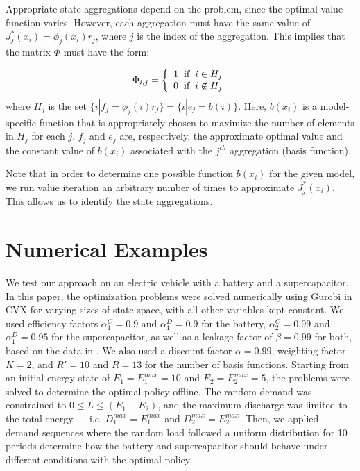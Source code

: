 \documentclass[conference]{IEEEtran}
\begin{document}
    Appropriate state aggregations depend on the problem, since the optimal value function varies. %
    However, each aggregation must have the same value of $J^{*}_{j}(x_{i}) = \phi_{j}(x_{i})r_{j}$, where $j$ is the index of the aggregation. This implies that the matrix $\Phi$ must have the form:
    
    \begin{displaymath}
        \Phi_{i,j}=\left\{
            \begin{array}{l}
            1 \hspace{0.2cm} \text{if} \hspace{0.2cm} i\in H_{j}\\
            0 \hspace{0.2cm} \text{if} \hspace{0.2cm} i\not\in H_{j}
            \end{array}
            \right.
    \end{displaymath}where $H_{j}$ is the set $\{i|f_{j} = \phi_{j}(i)r_{j}\}=\{i|e_{j} = b(i)\}$. Here, $b(x_{i})$ is a model-specific function that is appropriately chosen to maximize the number of elements in $H_{j}$ for each $j$. $f_{j}$ and $e_{j}$ are, respectively, the approximate optimal value and the constant value of $b(x_{i})$ associated with the $j^{th}$ aggregation (basis function).
	
	Note that in order to determine one possible function $b(x_{i})$ for the given model, we run value iteration an arbitrary number of times to approximate $J^{*}_{j}(x_{i})$. This allows us to identify the state aggregations.
    

\section{Numerical Examples}
We test our approach on an electric vehicle with a battery and a supercapacitor. In this paper, the optimization problems were solved numerically using Gurobi in CVX for varying sizes of state space, with all other variables kept constant. We used efficiency factors $\alpha^{C}_{1}=0.9$ and $\alpha^{D}_{1}=0.9$ for the battery, $\alpha^{C}_{2}=0.99$ and $\alpha^{D}_{1}=0.95$ for the supercapacitor, as well as a leakage factor of $\beta=0.99$ for both, based on the data in \cite{BattSupercapEff}. We also used a discount factor $\alpha=0.99$, weighting factor $K=2$, and $R'=10$ and $R=13$ for the number of basis functions. Starting from an initial energy state of $E_{1}=E_{1}^{max}=10$ and $E_{2}=E_{2}^{max}=5$, the problems were solved to determine the optimal policy offline. The random demand was constrained to $0\leq L \leq (E_{1}+E_{2})$, and the maximum discharge was limited to the total energy --- i.e. $D_{1}^{max}=E_{1}^{max}$ and $D_{2}^{max}=E_{2}^{max}$. Then, we applied demand sequences where the random load followed a uniform distribution for 10 periods determine how the battery and supercapacitor should behave under different conditions with the optimal policy.
\end{document}
